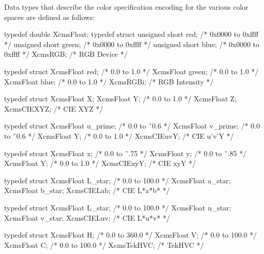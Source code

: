 \documentclass{report}
\begin{document}
\begin{itemize}
            \bigbreak \noindent 
            Data types that describe the color specification encoding for the various color spaces are defined as follows:
            \bigbreak \noindent 
            \begin{cppcode}
                typedef double XcmsFloat;
                typedef struct {
                    unsigned short red; /* 0x0000 to 0xffff */
                    unsigned short green; /* 0x0000 to 0xffff */
                    unsigned short blue; /* 0x0000 to 0xffff */
                } XcmsRGB; /* RGB Device */

                typedef struct {
                    XcmsFloat red; /* 0.0 to 1.0 */
                    XcmsFloat green; /* 0.0 to 1.0 */
                    XcmsFloat blue; /* 0.0 to 1.0 */
                } XcmsRGBi; /* RGB Intensity */

                typedef struct {
                    XcmsFloat X;
                    XcmsFloat Y; /* 0.0 to 1.0 */
                    XcmsFloat Z;
                } XcmsCIEXYZ; /* CIE XYZ */

                typedef struct {
                    XcmsFloat u_prime; /* 0.0 to ˜0.6 */
                    XcmsFloat v_prime; /* 0.0 to ˜0.6 */
                    XcmsFloat Y; /* 0.0 to 1.0 */
                } XcmsCIEuvY; /* CIE u’v’Y */
            \end{cppcode}
            \bigbreak \noindent 
            \begin{cppcode}
                typedef struct {
                    XcmsFloat x; /* 0.0 to ˜.75 */
                    XcmsFloat y; /* 0.0 to ˜.85 */
                    XcmsFloat Y; /* 0.0 to 1.0 */
                } XcmsCIExyY; /* CIE xyY */

                typedef struct {
                    XcmsFloat L_star; /* 0.0 to 100.0 */
                    XcmsFloat a_star;
                    XcmsFloat b_star;
                } XcmsCIELab; /* CIE L*a*b* */

                typedef struct {
                    XcmsFloat L_star; /* 0.0 to 100.0 */
                    XcmsFloat u_star;
                    XcmsFloat v_star;
                } XcmsCIELuv; /* CIE L*u*v* */

                typedef struct {
                    XcmsFloat H; /* 0.0 to 360.0 */
                    XcmsFloat V; /* 0.0 to 100.0 */
                    XcmsFloat C; /* 0.0 to 100.0 */
                } XcmsTekHVC; /* TekHVC */


\end{cppcode}
\end{itemize}
\end{document}
